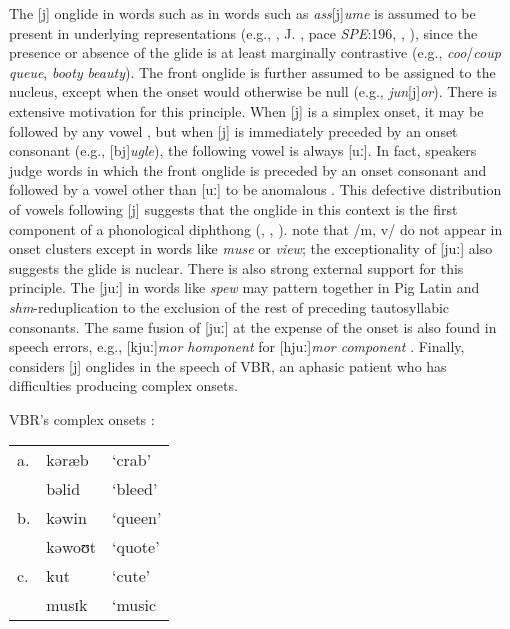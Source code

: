 The [j] onglide in words such as in words such as \emph{ass}[j]\emph{ume} is assumed to be present in underlying representations (e.g., \citealt[][278]{Borowsky1986}, J. \citealt{Anderson1988b}, pace \emph{SPE}:196, \citealt[][89]{Halle1985a}, \citealt[][217]{McMahon1990}), since the presence or absence of the glide is at least marginally contrastive (e.g., \emph{coo}/\emph{coup} \alt{} \emph{queue}, \emph{booty} \alt{} \emph{beauty}). The front onglide is further assumed to be assigned to the nucleus, except when the onset would otherwise be null (e.g., \emph{jun}[j]\emph{or}). 
There is extensive motivation for this principle. When [j] is a simplex onset, it may be followed by any vowel \citep[][276]{Borowsky1986}, but when [j] is immediately preceded by an onset consonant (e.g., [bj]\emph{ugle}), the following vowel is always [uː]. In fact, speakers judge words in which the front onglide is preceded by an onset consonant and followed by a vowel other than [uː] to be anomalous \citep{Moreland2009}. This defective distribution of vowels following [j] suggests that the onglide in this context is the first component of a phonological diphthong (\citealp[][232]{Hayes1980}, \citealp[][61f.]{Harris1994}, \citealp{Davis1995}). \citet[][42]{Clements1983} note that /m, v/ do not appear in onset clusters except in words like \emph{muse} or \emph{view}; the exceptionality of [juː] also suggests the glide is nuclear. There is also strong external support for this principle. The [juː] in words like \emph{spew} may pattern together in Pig Latin \citep{Davis1995,Idsardi2005} and \emph{shm}-reduplication \citep{Nevins2003} to the exclusion of the rest of preceding tautosyllabic consonants. The same fusion of [juː] at the expense of the onset is also found in speech errors, e.g., [kjuː]\emph{mor homponent} for [hjuː]\emph{mor component} \citep[][130]{Shattuck-Hufnagel1986}. Finally, \citet{Buchwald2005} considers [j] onglides in the speech of VBR, an aphasic patient who has difficulties producing complex onsets. 

\begin{example}
\label{VBR}
VBR's complex onsets \citep[79--80, his transcriptions]{Buchwald2005}:

\vspace{0.5\baselineskip}
\begin{tabular}{l l l}
a. & kəræb  & `crab'  \\
   & bəlid  & `bleed' \\
b. & kəwin  & `queen' \\
   & kəwoʊt & `quote' \\
c. & kut    & `cute'  \\
   & musɪk  & `music  \\ 
\end{tabular}
\end{example}

